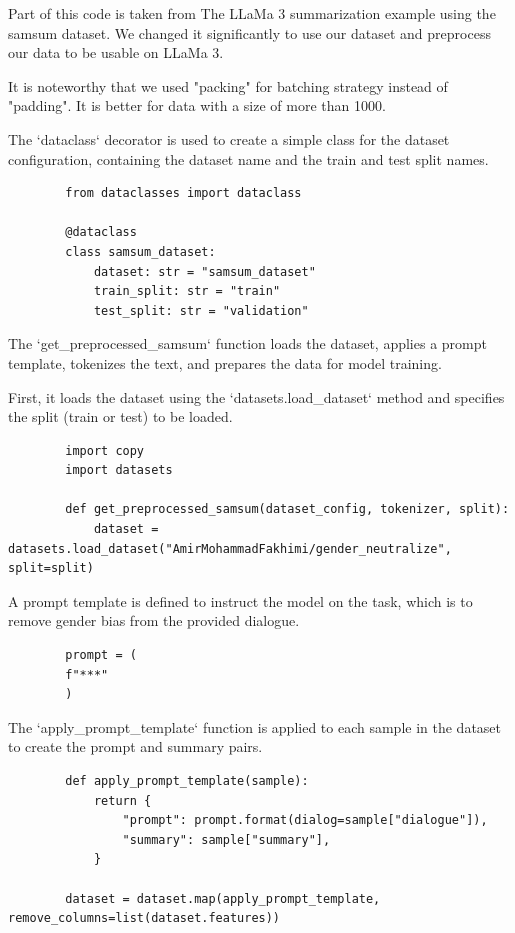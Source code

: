 \documentclass{solutionclass} %
\begin{document}
Part of this code is taken from The LLaMa 3 summarization example using the samsum dataset. We changed it significantly to use our dataset and preprocess our data to be usable on LLaMa 3.

It is noteworthy that we used "packing" for batching strategy instead of "padding". It is better for data with a size of more than 1000.



\begin{solution}
	The `dataclass` decorator is used to create a simple class for the dataset configuration, containing the dataset name and the train and test split names.
	\begin{lstlisting}
		from dataclasses import dataclass
		
		@dataclass
		class samsum_dataset:
			dataset: str = "samsum_dataset"
			train_split: str = "train"
			test_split: str = "validation"
		\end{lstlisting}
\end{solution}

\begin{solution}
	The `get\_preprocessed\_samsum` function loads the dataset, applies a prompt template, tokenizes the text, and prepares the data for model training. 
	
	First, it loads the dataset using the `datasets.load\_dataset` method and specifies the split (train or test) to be loaded.
	\begin{lstlisting}
		import copy
		import datasets
		
		def get_preprocessed_samsum(dataset_config, tokenizer, split):
			dataset = datasets.load_dataset("AmirMohammadFakhimi/gender_neutralize", split=split)
		\end{lstlisting}
\end{solution}

\begin{solution}
	A prompt template is defined to instruct the model on the task, which is to remove gender bias from the provided dialogue.
	\begin{lstlisting}
		prompt = (
		f"***"
		)
	\end{lstlisting}
\end{solution}

\begin{solution}
	The `apply\_prompt\_template` function is applied to each sample in the dataset to create the prompt and summary pairs.
	\begin{lstlisting}
		def apply_prompt_template(sample):
			return {
				"prompt": prompt.format(dialog=sample["dialogue"]),
				"summary": sample["summary"],
			}
		
		dataset = dataset.map(apply_prompt_template, remove_columns=list(dataset.features))
		\end{lstlisting}
\end{solution}
\end{document}
